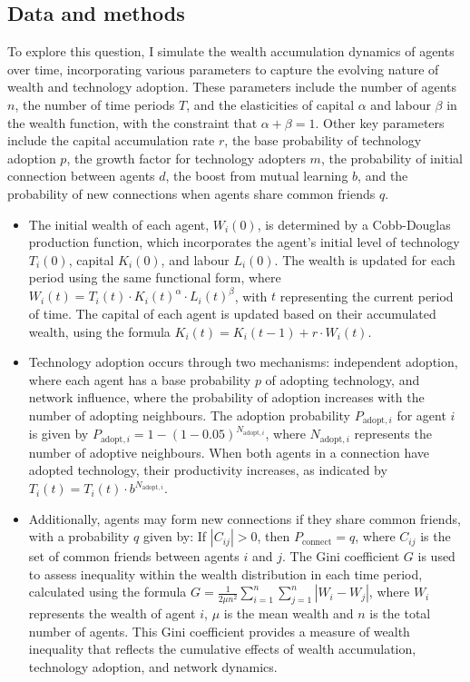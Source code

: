 \documentclass[12pt]{article}
\begin{document}
\subsection{Data and methods}
To explore this question, I simulate the wealth accumulation dynamics of agents over time, incorporating various parameters to capture the evolving nature of wealth and technology adoption. These parameters include the number of agents \(n\), the number of time periods \(T\), and the elasticities of capital \(\alpha\) and labour \(\beta\) in the wealth function, with the constraint that \(\alpha + \beta = 1\). Other key parameters include the capital accumulation rate \(r\), the base probability of technology adoption \(p\), the growth factor for technology adopters \(m\), the probability of initial connection between agents \(d\), the boost from mutual learning \(b\), and the probability of new connections when agents share common friends \(q\).

\begin{itemize}
    \item The initial wealth of each agent, \(W_i(0)\), is determined by a Cobb-Douglas production function, which incorporates the agent's initial level of technology \(T_i(0)\), capital \(K_i(0)\), and labour \(L_i(0)\). The wealth is updated for each period using the same functional form, where \(W_i(t) = T_i(t) \cdot K_i(t)^\alpha \cdot L_i(t)^\beta\), with \(t\) representing the current period of time. The capital of each agent is updated based on their accumulated wealth, using the formula \(K_i(t) = K_i(t-1) + r \cdot W_i(t)\).
    \item Technology adoption occurs through two mechanisms: independent adoption, where each agent has a base probability \(p\) of adopting technology, and network influence, where the probability of adoption increases with the number of adopting neighbours. The adoption probability \(P_{\text{adopt}, i}\) for agent \(i\) is given by \(P_{\text{adopt}, i} = 1 - (1 - 0.05)^{N_{\text{adopt}, i}}\), where \(N_{\text{adopt}, i}\) represents the number of adoptive neighbours. When both agents in a connection have adopted technology, their productivity increases, as indicated by \(T_i(t) = T_i(t) \cdot b^{N_{\text{adopt}, i}}\).
    \item Additionally, agents may form new connections if they share common friends, with a probability \(q\) given by: If \(|C_{ij}| > 0\), then \(P_{\text{connect}} = q\), where \(C_{ij}\) is the set of common friends between agents \(i\) and \(j\). The Gini coefficient \(G\) is used to assess inequality within the wealth distribution in each time period, calculated using the formula \(G = \frac{1}{2 \mu n^2} \sum_{i=1}^n \sum_{j=1}^n |W_i - W_j|\), where \(W_i\) represents the wealth of agent \(i\), \(\mu\) is the mean wealth and \(n\) is the total number of agents. This Gini coefficient provides a measure of wealth inequality that reflects the cumulative effects of wealth accumulation, technology adoption, and network dynamics.
\end{itemize}
\end{document}
